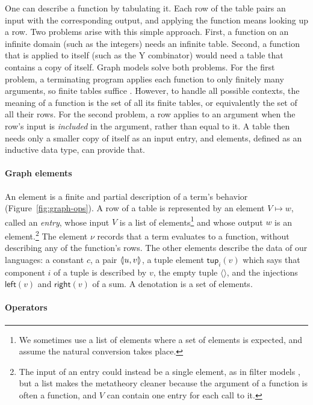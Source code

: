 One can describe a function by tabulating it. Each row of the table
pairs an input with the corresponding output, and applying the
function means looking up a row. Two problems arise with this simple
approach. First, a function on an infinite domain (such as the
integers) needs an infinite table. Second, a function that is applied
to itself (such as the Y combinator) would need a table that contains
a copy of itself. Graph models solve both problems. For the first
problem, a terminating program applies each function to only finitely
many arguments, so finite tables suffice
\citep{Scott:1976lq,Plotkin:1993ab}. However, to handle all possible
contexts, the meaning of a function is the set of all its finite
tables, or equivalently the set of all their rows. For the second
problem, a row applies to an argument when the row's input is
\emph{included} in the argument, rather than equal to it. A table then
needs only a smaller copy of itself as an input entry, and elements,
defined as an inductive data type, can provide that.

\paragraph{Graph elements}

An element is a finite and partial description of a term's behavior
(Figure~\ref{fig:graph-ops}). A row of a table is represented by an
element $V \mapsto w$, called an \emph{entry}, whose input $V$ is a
list of elements\footnote{We sometimes use a list of elements where a
set of elements is expected, and assume the natural conversion takes
place.}  and whose output $w$ is an element.\footnote{The input of an
entry could instead be a single element, as in filter models
\citep{Barendregt:1983aa}, but a list makes the metatheory cleaner
because the argument of a function is often a function, and $V$ can
contain one entry for each call to it.} The element $\nu$ records that
a term evaluates to a function, without describing any of the
function's rows. The other elements describe the data of our
languages: a constant $c$, a pair $\langle\!|u,v|\!\rangle$, a tuple element
$\mathsf{tup}_i(v)$ which says that component $i$ of a tuple is
described by $v$, the empty tuple $\langle\rangle$, and the injections
$\mathsf{left}(v)$ and $\mathsf{right}(v)$ of a sum. A denotation is a
set of elements.

\paragraph{Operators}

